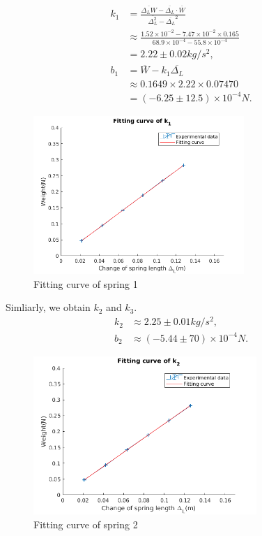     \begin{figure}[h]    
        \begin{minipage}{0.5\linewidth}
            \[
            \begin{split}
                k_1&=\frac{\overline{\Delta_LW}-\overline{\Delta_L}\cdot\overline{W}}{\overline{\Delta_L^2}-\overline{\Delta_L}^2}\\[0.2cm]
                &\approx \frac{1.52\times10^{-2}-7.47\times10^{-2}\times0.165}{68.9\times10^{-4}-55.8\times10^{-4}}\\[0.2cm]
                &=2.22\pm 0.02kg/s^2,\\[0.4cm]
                b_1&=\overline{W}-k_1\overline{\Delta_L}\\[0.2cm]
                &\approx 0.1649\times 2.22 \times 0.07470\\[0.2cm]
                &=(-6.25\pm 12.5)\times10^{-4}N.
            \end{split}
            \]
        \end{minipage}
        \begin{minipage}{0.4\linewidth}
            \centering
            \includegraphics[height=6cm]{images/k1.png}
        \end{minipage}
        \caption{Fitting curve of spring 1}\label{k_1}
    \end{figure}

    Simliarly, we obtain $k_2$ and $k_3$.
    \[
    \begin{split}
        k_2&\approx 2.25\pm 0.01kg/s^2,\\
        b_2&\approx (-5.44\pm 70) \times10^{-4}N.
    \end{split}
    \]
    \begin{figure}[h]
        \centering
        \includegraphics[height=6cm]{images/k2.png}
        \caption{Fitting curve of spring 2}\label{k_2}
    \end{figure}\\
    
